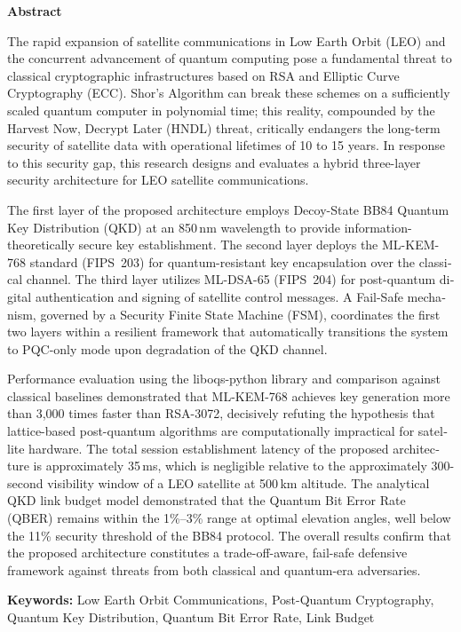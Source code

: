 \documentclass[a4paper,14pt]{extreport}
\begin{document}
\newpage
\pagestyle{plain}
\begin{latin}
\setlength{\parindent}{0pt}
\setlength{\parskip}{6pt}

\begin{center}

{\Large\textbf{Abstract}}
\end{center}

\vspace{0.5cm}

The rapid expansion of satellite communications in Low Earth Orbit (LEO) and the concurrent advancement of quantum computing pose a fundamental threat to classical cryptographic infrastructures based on RSA and Elliptic Curve Cryptography (ECC). Shor's Algorithm can break these schemes on a sufficiently scaled quantum computer in polynomial time; this reality, compounded by the Harvest Now, Decrypt Later (HNDL) threat, critically endangers the long-term security of satellite data with operational lifetimes of 10 to 15 years. In response to this security gap, this research designs and evaluates a hybrid three-layer security architecture for LEO satellite communications.

The first layer of the proposed architecture employs Decoy-State BB84 Quantum Key Distribution (QKD) at an 850\,nm wavelength to provide information-theoretically secure key establishment. The second layer deploys the ML-KEM-768 standard (FIPS~203) for quantum-resistant key encapsulation over the classical channel. The third layer utilizes ML-DSA-65 (FIPS~204) for post-quantum digital authentication and signing of satellite control messages. A Fail-Safe mechanism, governed by a Security Finite State Machine (FSM), coordinates the first two layers within a resilient framework that automatically transitions the system to PQC-only mode upon degradation of the QKD channel.

Performance evaluation using the liboqs-python library and comparison against classical baselines demonstrated that ML-KEM-768 achieves key generation more than 3{,}000 times faster than RSA-3072, decisively refuting the hypothesis that lattice-based post-quantum algorithms are computationally impractical for satellite hardware. The total session establishment latency of the proposed architecture is approximately 35\,ms, which is negligible relative to the approximately 300-second visibility window of a LEO satellite at 500\,km altitude. The analytical QKD link budget model demonstrated that the Quantum Bit Error Rate (QBER) remains within the 1\%--3\% range at optimal elevation angles, well below the 11\% security threshold of the BB84 protocol. The overall results confirm that the proposed architecture constitutes a trade-off-aware, fail-safe defensive framework against threats from both classical and quantum-era adversaries.

\vspace{0.8cm}
\noindent\textbf{Keywords:} Low Earth Orbit Communications, Post-Quantum Cryptography, Quantum Key Distribution, Quantum Bit Error Rate, Link Budget

\end{latin}
\end{document}
